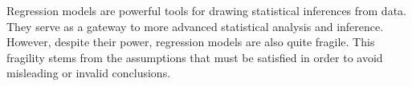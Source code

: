 Regression models are powerful tools for drawing statistical inferences from data. They serve as a gateway to more advanced statistical analysis and inference. However, despite their power, regression models are also quite fragile. This fragility stems from the assumptions that must be satisfied in order to avoid misleading or invalid conclusions. 